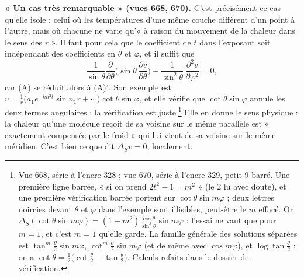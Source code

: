 \documentclass[11pt,a4paper]{article}
\begin{document}
\textbf{« Un cas très remarquable » (vues 668, 670).} C'est précisément ce cas
qu'elle isole : celui où les températures d'une même couche diffèrent d'un
point à l'autre, mais où chacune ne varie qu'« à raison du mouvement de la
chaleur dans le sens des $r$ ». Il faut pour cela que le coefficient de $t$ dans
l'exposant soit indépendant des coefficients en $\theta$ et $\varphi$, et il
suffit que
\[
\frac{1}{\sin\theta}\frac{\partial}{\partial\theta}\Big(\sin\theta\,
\frac{\partial v}{\partial\theta}\Big) + \frac{1}{\sin^2\theta}\,
\frac{\partial^2 v}{\partial\varphi^2} = 0 ,
\]
car (A) se réduit alors à (A)$'$. Son exemple est $v = \frac1r\big(a_1
e^{-kn_1^2t}\sin n_1 r + \cdots\big)\cot\theta\sin\varphi$, et elle vérifie que
$\cot\theta\sin\varphi$ annule les deux termes angulaires ; la vérification
est juste.\footnote{Vue 668, série à l'encre 328 ; vue 670, série à l'encre 329,
petit 9 barré. Une première ligne barrée, « si on prend $2t^2 - 1 = m^2$ »
(le 2 lu avec doute), et une première vérification barrée portent sur
$\cot\theta\sin m\varphi$ ; deux lettres noircies devant $\theta$ et $\varphi$
dans l'exemple sont illisibles, peut-être le $m$ effacé. Or $\Delta_S(\cot\theta
\sin m\varphi) = (1 - m^2)\frac{\cos\theta}{\sin^3\theta}\sin m\varphi$ :
l'essai ne vaut que pour $m = 1$, et c'est $m = 1$ qu'elle garde. La famille
générale des solutions séparées est $\tan^m\frac\theta2\sin m\varphi$,
$\cot^m\frac\theta2\sin m\varphi$ (et de même avec $\cos m\varphi$), et
$\log\tan\frac\theta2$ ; on a $\cot\theta = \frac12\big(\cot\frac\theta2 -
\tan\frac\theta2\big)$. Calculs refaits dans le dossier de vérification.} Elle
en donne le sens physique : la chaleur qu'une molécule reçoit de sa voisine sur
le même parallèle est « exactement compensée par le froid » qui lui vient de sa
voisine sur le même méridien. C'est bien ce que dit $\Delta_S v = 0$, localement.
\end{document}
